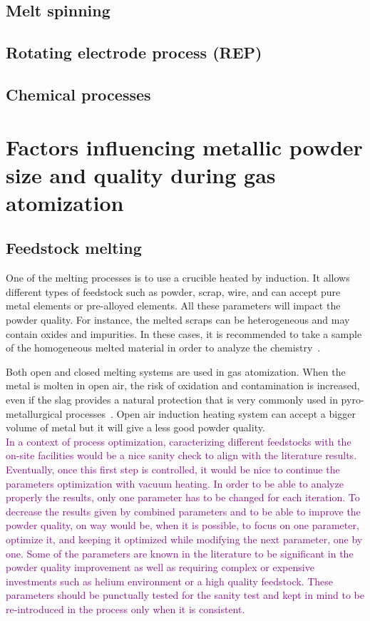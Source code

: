 \subsection{Melt spinning}
\subsection{Rotating electrode process (REP)}
\subsection{Chemical processes}

\section{Factors influencing metallic powder size and quality during gas atomization}

\subsection{Feedstock melting}

One of the melting processes is to use a crucible heated by induction. It allows different types of feedstock such as powder, scrap, wire, and can accept pure metal elements or pre-alloyed elements. All these parameters will impact the powder quality. For instance, the melted scraps can be heterogeneous and may contain oxides and impurities. In these cases, it is recommended to take a sample of the homogeneous melted material in order to analyze the chemistry~\cite{Kassym2020Atomizationprocesses}.

Both open and closed melting systems are used in gas atomization. When the metal is molten in open air, the risk of oxidation and contamination is increased, even if the slag provides a natural protection that is very commonly used in pyro-metallurgical processes~\cite{Holappa2016SlagFormation}. Open air induction heating system can accept a bigger volume of metal but it will give a less good powder quality.\\

\textcolor{Purple}{In a context of process optimization, caracterizing different feedstocks with the on-site facilities would be a nice sanity check to align with the literature results. Eventually, once this first step is controlled, it would be nice to continue the parameters optimization with vacuum heating. In order to be able to analyze properly the results, only one parameter has to be changed for each iteration. To decrease the results given by combined parameters and to be able to improve the powder quality, on way would be, when it is possible, to focus on one parameter, optimize it, and keeping it optimized while modifying the next parameter, one by one. Some of the parameters are known in the literature to be significant in the powder quality improvement as well as requiring complex or expensive investments such as helium environment or a high quality feedstock. These parameters should be punctually tested for the sanity test and kept in mind to be re-introduced in the process only when it is consistent.}


